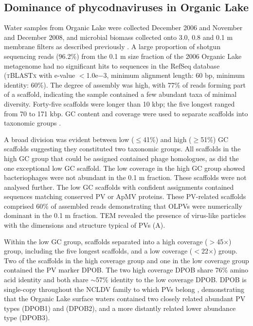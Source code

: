 \subsection{Dominance of phycodnaviruses in Organic Lake}
Water samples from Organic Lake were collected December 2006 and November and December 2008, and microbial biomass collected onto 3.0, 0.8 and 0.1 \textmu{}m membrane filters as described previously \cite{Lauro2011}. 
A large proportion of shotgun sequencing reads (96.2\%) from the 0.1 \textmu{}m size fraction of the 2006 Organic Lake metagenome  had no significant hits to sequences in the RefSeq database 
(\textsc{tBLASTx} with e-value $<$1.0e$-$3, minimum alignment length: 60 bp, minimum identity: 60\%). 
The degree of assembly was high, with 77\% of reads forming part of a scaffold, indicating the sample contained a few abundant taxa of minimal diversity. 
Forty-five scaffolds were longer than 10 kbp; the five longest ranged from 70 to 171 kbp. 
GC content and coverage were used to separate scaffolds into taxonomic groups .
 
A broad division was evident between low ($\le$41\%) and high ($\ge$51\%) GC scaffolds suggesting they constituted two taxonomic groups. 
All scaffolds in the high GC group that could be assigned contained phage homologues, as did the one exceptional low GC scaffold. 
The low coverage in the high GC group showed bacteriophages were not abundant in the 0.1 \textmu{}m fraction. 
These scaffolds were not analysed further. 
The low GC scaffolds with confident assignments contained sequences matching conserved \ac{PV} or \ac{ApMV} proteins. 
These \ac{PV}-related scaffolds comprised 60\% of assembled reads demonstrating that \acp{OLPV} were numerically dominant in the 0.1 \textmu{}m fraction. 
\ac{TEM} revealed the presence of virus-like particles with the dimensions and structure typical of PVs (A).


Within the low GC group, scaffolds separated into a high coverage ($>$45$\times$) group, including the five longest scaffolds, and a low coverage ($<$22$\times$) group. 
Two of the scaffolds in the high coverage group and one in the low coverage group contained the \ac{PV} marker \ac{DPOB}. 
The two high coverage \ac{DPOB} share 76\% amino acid identity and both share $\sim$57\% identity to the low coverage \ac{DPOB}. 
\ac{DPOB} is single-copy throughout the \ac{NCLDV} family to which \acp{PV} belong \cite{Iyer2001, Iyer2006}, 
demonstrating that the Organic Lake surface waters contained two closely related abundant \ac{PV} types (\ac{DPOB}1) and (\ac{DPOB}2), and a more distantly related lower abundance type (\ac{DPOB}3). 

